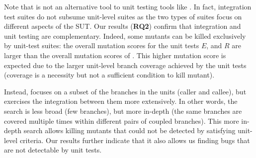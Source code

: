 Note that \cling is not an alternative tool to unit testing tools like \evosuite. In fact, integration test suites do not subsume unit-level suites as the two types of suites focus on different aspects of the SUT. Our results (\textbf{RQ2}) confirm that integration and unit testing are complementary. Indeed, some mutants can be killed exclusively by unit-test suites: the overall mutation scores for the unit tests $E$, and $R$ are larger than the overall mutation scores of \cling. This higher mutation score is expected due to the larger unit-level branch coverage achieved by the unit tests (coverage is a necessity but not a sufficient condition to kill mutant). 

Instead, \cling focuses on a subset of the branches in the units (caller and callee), but exercises the integration between them more extensively. In other words, the search is less broad (few branches), but more in-depth (the same branches are covered multiple times within different pairs of coupled branches). This more in-depth search allows killing mutants that could not be detected by satisfying unit-level criteria. %
Our results further indicate that it also allows us finding bugs that are not detectable by unit tests.



